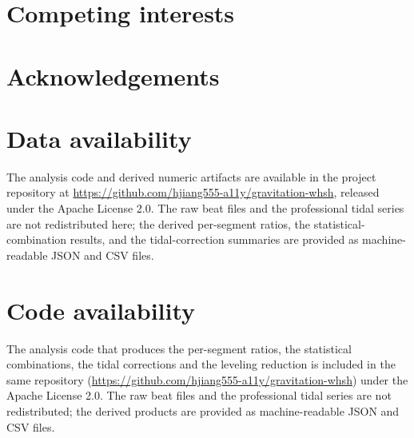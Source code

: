 \documentclass[11pt,a4paper]{article}
\begin{document}
\section*{Competing interests}


\section*{Acknowledgements}


\section*{Data availability}
The analysis code and derived numeric artifacts are available in the
project repository at
\url{https://github.com/hjiang555-a11y/gravitation-whsh}, released under the
Apache License 2.0. The raw beat files and the professional tidal series
are not redistributed here; the derived per-segment ratios, the
statistical-combination results, and the tidal-correction summaries are
provided as machine-readable JSON and CSV files.


\section*{Code availability}
The analysis code that produces the per-segment ratios, the statistical
combinations, the tidal corrections and the leveling reduction is included
in the same repository
(\url{https://github.com/hjiang555-a11y/gravitation-whsh}) under the Apache
License 2.0. The raw beat files and the professional tidal series are not
redistributed; the derived products are provided as machine-readable JSON
and CSV files.
\end{document}
